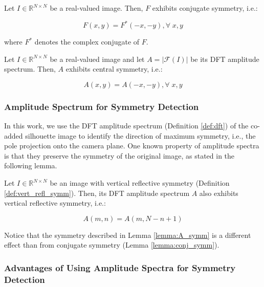 \begin{lemma}
    \label{lemma:conj_symm}
    
        Let $I\in \mathbb{R}^{N\times N}$ be a real-valued image. Then, $F$ exhibits conjugate symmetry, i.e.:

    \begin{equation}
        F(x,y) = F^*(-x,-y),\forall \; x,y
    \end{equation}

    where $F^*$ denotes the complex conjugate of $F$.
\end{lemma}

\begin{corollary}
     \label{cor:A_symm}
     Let $I\in \mathbb{R}^{N\times N}$ be a real-valued image and let $A = |\mathcal{F}(I)|$ be its DFT amplitude spectrum. Then, $A$ exhibits central symmetry, i.e.:

     \begin{equation}
        A(x,y) = A(-x,-y),\forall \; x,y
    \end{equation}
\end{corollary}

\subsubsection{Amplitude Spectrum for Symmetry Detection}

In this work, we use the DFT amplitude spectrum (Definition \ref{def:dft}) of the co-added silhouette image to identify the direction of maximum symmetry, i.e., the pole projection onto the camera plane. One known property of amplitude spectra is that they preserve the symmetry of the original image, as stated in the following lemma.

\begin{lemma}
    \label{lemma:A_symm}
    Let $I\in\mathbb{R}^{N\times N}$ be an image with vertical reflective symmetry (Definition \ref{def:vert_refl_symm}). Then, its DFT amplitude spectrum $A$ also exhibits vertical reflective symmetry, i.e.:

\begin{equation}
    A(m,n) = A(m,N-n+1)
\end{equation}
\end{lemma}

Notice that the symmetry described in Lemma \ref{lemma:A_symm} is a different effect than from conjugate symmetry (Lemma \ref{lemma:conj_symm}).

\subsubsection{Advantages of Using Amplitude Spectra for Symmetry Detection}

